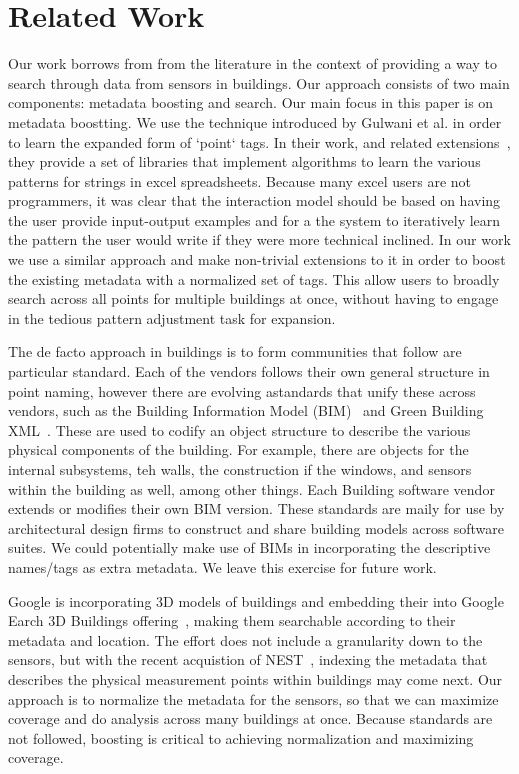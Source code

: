 \section{Related Work}

Our work borrows from from the literature in the context of providing a way to search
through data from sensors in buildings.  Our approach consists of two main components:
metadata boosting and search.  Our main focus in this paper is on metadata boostting.
We use the technique introduced by Gulwani et al.\cite{Gulwani:2011} in order to learn 
the expanded form of `point` tags.  In their work, and related extensions~\cite{Harris:2011,
Singh:2012,Gulwani12spreadsheetdata}, they provide a set of libraries that implement
algorithms to learn the various patterns for strings in excel spreadsheets.  Because many
excel users are not programmers, it was clear that the interaction model should be based
on having the user provide input-output examples and for a the system to iteratively learn
the pattern the user would write if they were more technical inclined.  In our work
we use a similar approach and make non-trivial extensions to it in order to boost the
existing metadata with a normalized set of tags.  This allow users to broadly search across
all points for multiple buildings at once, without having to engage in the tedious
pattern adjustment task for expansion.

The de facto approach in buildings is to form communities that follow are particular standard.
Each of the vendors follows their own general structure in point naming, however there
are evolving astandards that unify these across vendors, such as the Building
Information Model (BIM)~\cite{BIM} and Green Building XML~\cite{GBXML}.  These are used to
codify an object structure to describe the various physical components of the building.
For example, there are objects for the internal subsystems, teh walls, the construction
if the windows, and sensors within the building as well, among other things.  Each
Building software vendor extends or modifies their own BIM version.
These standards are maily 
for use by architectural design firms to construct and share building models across software
suites. We could potentially make use of BIMs in incorporating the descriptive names/tags
as extra metadata.  We leave this exercise for future work.

Google is incorporating 3D models of buildings and embedding their into Google 
Earch 3D Buildings offering~\cite{google_3dbuildings}, making them searchable according 
to their metadata and location.
The effort does not include a granularity down to the sensors, but with the recent acquistion
of NEST~\cite{nest}, indexing the metadata that describes the physical measurement points
within buildings may come next.  Our approach is to normalize the metadata for the sensors,
so that we can maximize coverage and do analysis across many buildings at once.  Because standards
are not followed, boosting is critical to achieving normalization and maximizing coverage.


